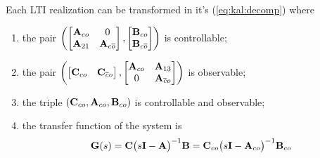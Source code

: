 	\begin{theorem} \label{th:kal:decomp}
		Each LTI realization can be transformed in it's  (\ref{eq:kal:decomp}) where
		\begin{enumerate}[\itshape i)]
			\item the pair $\left( \begin{bmatrix} \mathbf{A}_{co} & 0 \\ \mathbf{A}_{21} & \mathbf{A}_{c\overline o}  \end{bmatrix}, \begin{bmatrix} \mathbf{B}_{co}\\ \mathbf{B}_{c\overline o}  \end{bmatrix} \right)$ is controllable;
			\item the pair $\left( \begin{bmatrix} \mathbf{C}_{co} & \mathbf{C}_{\overline co} \end{bmatrix} , \begin{bmatrix} \mathbf{A}_{co} & \mathbf{A}_{13} \\ 0 & \mathbf{A}_{\overline c o}  \end{bmatrix} \right)$ is observable;
			\item the triple $(\mathbf{C}_{co}, \mathbf{A}_{co}, \mathbf{B}_{co})$ is controllable and observable;
			\item the transfer function of the system is
			\begin{equation} \label{eq:kal:transferfun}
				\mathbf{G}(s) = \mathbf{C}\big(s\mathbf{I}-\mathbf{A}\big)^{-1} \mathbf{B} = \mathbf{C}_{co}\big(s\mathbf{I} -\mathbf{A}_{co}\big)^{-1} \mathbf{B}_{co}
			\end{equation}
		\end{enumerate}
	\end{theorem}
	
